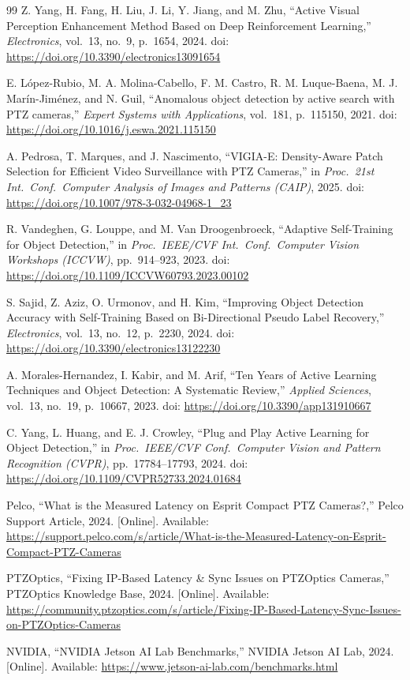 \documentclass[conf]{new-aiaa}
\begin{document}
\begin{thebibliography}{99}
Z. Yang, H. Fang, H. Liu, J. Li, Y. Jiang, and M. Zhu, ``Active Visual Perception Enhancement Method Based on Deep Reinforcement Learning,'' \textit{Electronics}, vol.\ 13, no.\ 9, p.\ 1654, 2024. doi: \url{https://doi.org/10.3390/electronics13091654}

E. L\'{o}pez-Rubio, M. A. Molina-Cabello, F. M. Castro, R. M. Luque-Baena, M. J. Mar\'{i}n-Jim\'{e}nez, and N. Guil, ``Anomalous object detection by active search with PTZ cameras,'' \textit{Expert Systems with Applications}, vol.\ 181, p.\ 115150, 2021. doi: \url{https://doi.org/10.1016/j.eswa.2021.115150}

A. Pedrosa, T. Marques, and J. Nascimento, ``VIGIA-E: Density-Aware Patch Selection for Efficient Video Surveillance with PTZ Cameras,'' in \textit{Proc.\ 21st Int.\ Conf.\ Computer Analysis of Images and Patterns (CAIP)}, 2025. doi: \url{https://doi.org/10.1007/978-3-032-04968-1_23}

R. Vandeghen, G. Louppe, and M. Van Droogenbroeck, ``Adaptive Self-Training for Object Detection,'' in \textit{Proc.\ IEEE/CVF Int.\ Conf.\ Computer Vision Workshops (ICCVW)}, pp.\ 914--923, 2023. doi: \url{https://doi.org/10.1109/ICCVW60793.2023.00102}

S. Sajid, Z. Aziz, O. Urmonov, and H. Kim, ``Improving Object Detection Accuracy with Self-Training Based on Bi-Directional Pseudo Label Recovery,'' \textit{Electronics}, vol.\ 13, no.\ 12, p.\ 2230, 2024. doi: \url{https://doi.org/10.3390/electronics13122230}

A. Morales-Hernandez, I. Kabir, and M. Arif, ``Ten Years of Active Learning Techniques and Object Detection: A Systematic Review,'' \textit{Applied Sciences}, vol.\ 13, no.\ 19, p.\ 10667, 2023. doi: \url{https://doi.org/10.3390/app131910667}

C. Yang, L. Huang, and E. J. Crowley, ``Plug and Play Active Learning for Object Detection,'' in \textit{Proc.\ IEEE/CVF Conf.\ Computer Vision and Pattern Recognition (CVPR)}, pp.\ 17784--17793, 2024. doi: \url{https://doi.org/10.1109/CVPR52733.2024.01684}

Pelco, ``What is the Measured Latency on Esprit Compact PTZ Cameras?,'' Pelco Support Article, 2024. [Online]. Available: \url{https://support.pelco.com/s/article/What-is-the-Measured-Latency-on-Esprit-Compact-PTZ-Cameras}

PTZOptics, ``Fixing IP-Based Latency \& Sync Issues on PTZOptics Cameras,'' PTZOptics Knowledge Base, 2024. [Online]. Available: \url{https://community.ptzoptics.com/s/article/Fixing-IP-Based-Latency-Sync-Issues-on-PTZOptics-Cameras}

NVIDIA, ``NVIDIA Jetson AI Lab Benchmarks,'' NVIDIA Jetson AI Lab, 2024. [Online]. Available: \url{https://www.jetson-ai-lab.com/benchmarks.html}

\end{thebibliography}
\end{document}
